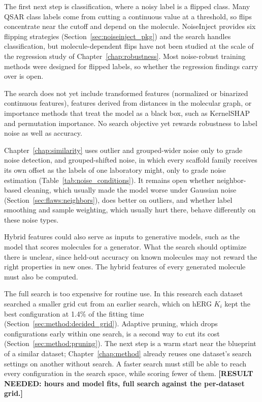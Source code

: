 The first next step is classification, where a noisy label is a flipped class. Many QSAR class labels come from cutting a continuous value at a threshold, so flips concentrate near the cutoff and depend on the molecule. NoiseInject provides six flipping strategies (Section~\ref{sec:noiseinject_pkg}) and the search handles classification, but molecule-dependent flips have not been studied at the scale of the regression study of Chapter~\ref{chap:robustness}. Most noise-robust training methods were designed for flipped labels, so whether the regression findings carry over is open.

The search does not yet include transformed features (normalized or binarized continuous features), features derived from distances in the molecular graph, or importance methods that treat the model as a black box, such as KernelSHAP and permutation importance. No search objective yet rewards robustness to label noise as well as accuracy.

Chapter~\ref{chap:similarity} uses outlier and grouped-wider noise only to grade noise detection, and grouped-shifted noise, in which every scaffold family receives its own offset as the labels of one laboratory might, only to grade noise estimation (Table~\ref{tab:noise_conditions}). It remains open whether neighbor-based cleaning, which usually made the model worse under Gaussian noise (Section~\ref{sec:flaws:neighbors}), does better on outliers, and whether label smoothing and sample weighting, which usually hurt there, behave differently on these noise types.

Hybrid features could also serve as inputs to generative models, such as the model that scores molecules for a generator. What the search should optimize there is unclear, since held-out accuracy on known molecules may not reward the right properties in new ones. The hybrid features of every generated molecule must also be computed.

The full search is too expensive for routine use. In this research each dataset searched a smaller grid cut from an earlier search, which on hERG $K_i$ kept the best configuration at 1.4\% of the fitting time (Section~\ref{sec:method:decided_grid}). Adaptive pruning, which drops configurations early within one search, is a second way to cut its cost (Section~\ref{sec:method:pruning}). The next step is a warm start near the blueprint of a similar dataset; Chapter~\ref{chap:method} already reuses one dataset's search settings on another without search. A faster search must still be able to reach every configuration in the search space, while scoring fewer of them. \textbf{[RESULT NEEDED: hours and model fits, full search against the per-dataset grid.]}

